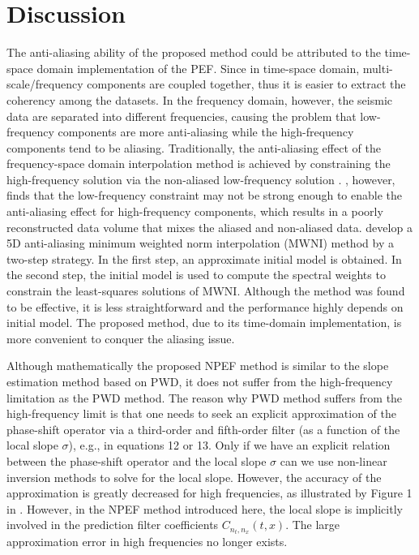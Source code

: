 \section{Discussion}
The anti-aliasing ability of the proposed method could be attributed to the time-space domain implementation of the PEF. Since in time-space domain, multi-scale/frequency components are coupled together, thus it is easier to extract the coherency among the datasets. In the frequency domain, however, the seismic data are separated into different frequencies, causing the problem that low-frequency components are more anti-aliasing while the high-frequency components tend to be aliasing. Traditionally, the anti-aliasing effect of the frequency-space domain interpolation method is achieved by constraining the high-frequency solution via the non-aliased low-frequency solution \cite[]{herrmann2000aliased}. \cite{cary2011aliasing}, however, finds that the low-frequency constraint may not be strong enough to enable the anti-aliasing effect for high-frequency components, which results in a poorly reconstructed data volume that mixes the aliased and non-aliased data. \cite{chiu20135d} develop a 5D anti-aliasing minimum weighted norm interpolation (MWNI) method by a two-step strategy. In the first step, an approximate initial model is obtained. In the second step, the initial model is used to compute the spectral weights to constrain the least-squares solutions of MWNI. Although the method was found to be effective, it is less straightforward and the performance highly depends on initial model. The proposed method, due to its time-domain implementation, is more convenient to conquer the aliasing issue.

Although mathematically the proposed NPEF method is similar to the slope estimation method based on PWD, it does not suffer from the high-frequency limitation as the PWD method.  The reason why PWD method suffers from the high-frequency limit is that one needs to seek an explicit approximation of the phase-shift operator via a third-order and fifth-order filter (as a function of the local slope $\sigma$), e.g., in equations 12 or 13. Only if we have an explicit relation between the phase-shift operator and the local slope $\sigma$ can we use non-linear inversion methods to solve for the local slope. However, the accuracy of the approximation is greatly decreased for high frequencies, as illustrated by Figure 1 in \cite{fomel2002pwd}. However, in the NPEF method introduced here, the local slope is implicitly involved in the prediction filter coefficients $C_{n_t,n_x}(t,x)$. The large approximation error in high frequencies no longer exists.%

